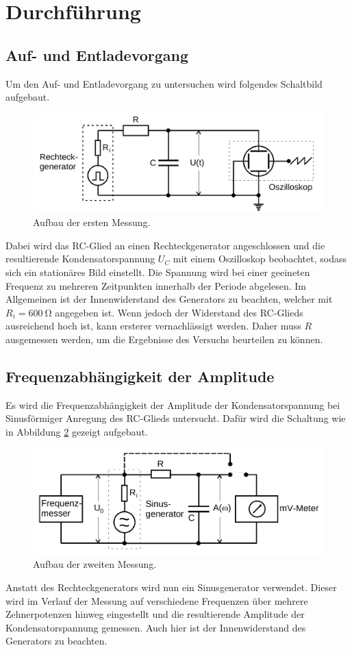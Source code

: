 \section{Durchführung}
\label{sec:Durchführung}
\subsection{Auf- und Entladevorgang}
Um den Auf- und Entladevorgang zu untersuchen wird folgendes Schaltbild aufgebaut.
\begin{figure}[H]
    \centering
    \includegraphics[width=\textwidth]{content/aufbau1.png}
    \caption{Aufbau der ersten Messung.\cite{v353}}
    \label{fig:mess1}
\end{figure}
\noindent
Dabei wird das RC-Glied an einen Rechteckgenerator angeschlossen und die resultierende Kondensatorspannung $U_C$ mit einem Oszilloskop beobachtet, sodass sich ein stationäres Bild einstellt. Die Spannung wird bei einer geeineten Frequenz zu mehreren Zeitpunkten innerhalb der Periode abgelesen.
Im Allgemeinen ist der Innenwiderstand des Generators zu beachten, welcher mit \mbox{$R_i=\SI{600}{\ohm}$\cite{v353}} angegeben ist. Wenn jedoch der Widerstand des RC-Glieds ausreichend hoch ist, kann ersterer vernachlässigt werden. Daher muss $R$ ausgemessen werden, um die Ergebnisse des Versuchs beurteilen zu können.
%
\subsection{Frequenzabhängigkeit der Amplitude}
Es wird die Frequenzabhängigkeit der Amplitude der Kondensatorspannung bei Sinusförmiger Anregung des RC-Glieds untersucht.
Dafür wird die Schaltung wie in Abbildung \ref{fig:mess2} gezeigt aufgebaut.
\begin{figure}[H]
    \centering
    \includegraphics[width=\textwidth]{content/aufbau2.png}
    \caption{Aufbau der zweiten Messung.\cite{v353}}
    \label{fig:mess2}
\end{figure}
\noindent
Anstatt des Rechteckgenerators wird nun ein Sinusgenerator verwendet. Dieser wird im Verlauf der Messung auf verschiedene Frequenzen über mehrere Zehnerpotenzen hinweg eingestellt und die resultierende Amplitude der Kondensatorspannung gemessen.
Auch hier ist der Innenwiderstand des Generators zu beachten.
%
